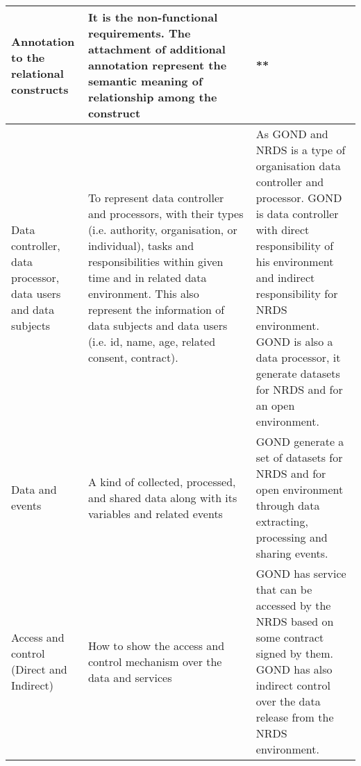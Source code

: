 \begin{longtable}{|p{0.22\linewidth}|p{0.48\linewidth}|p{0.6\linewidth}|}
   \hline
   Annotation to the relational constructs  &
   It is the non-functional requirements. The attachment of additional annotation represent the semantic meaning of relationship among the construct &  ** \\
 \hline
 Data controller, data processor, data users and data subjects  &
 To represent data controller and processors,  with their types (i.e. authority, organisation, or individual), tasks and responsibilities within given time and in related data environment. This also represent the information of data subjects and data users (i.e. id, name, age, related consent, contract). &  As GOND  and NRDS is a type of organisation data controller and processor. GOND is data controller with direct responsibility of his environment and indirect responsibility for NRDS environment. GOND is also a data processor, it generate datasets for NRDS and for an open environment.\\
    \hline
  Data and events & 
  A kind of collected, processed, and shared data along with its variables and related events  &  GOND generate a set of datasets for NRDS and for open environment through data extracting, processing and sharing events.  \\
  \hline
  Access and control (Direct and Indirect)  &
  How to show the access and control mechanism over the data and services &  GOND has service that can be accessed by the NRDS  based on some contract signed by them. GOND has also indirect control over the data release from the NRDS environment.  \\
\hline
\end{longtable}